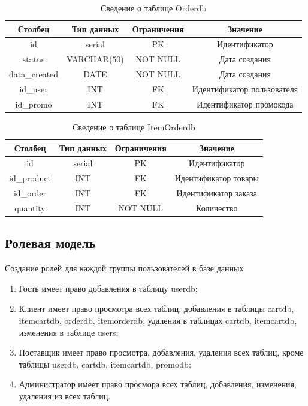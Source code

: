 \begin{table}[H]
	\begin{center}
		\caption{Сведение о таблице Orderdb}
		\begin{tabular}{|c|c|c|c|}
			\hline
			Столбец & Тип данных & Ограничения & Значение \\
			\hline
			id & serial & PK & Идентификатор \\
			\hline
			status & VARCHAR(50) & NOT NULL & Дата создания \\
			\hline
			data\_created & DATE & NOT NULL & Дата создания \\
			\hline
			id\_user & INT & FK & Идентификатор пользователя\\
			\hline
			id\_promo & INT & FK & Идентификатор промокода\\
			\hline			
		\end{tabular}
		\label{table:db:Orderdb}
	\end{center}
\end{table}

\begin{table}[H]
	\begin{center}
		\caption{Сведение о таблице ItemOrderdb}
		\begin{tabular}{|c|c|c|c|}
			\hline
			Столбец & Тип данных & Ограничения & Значение \\
			\hline
			id & serial & PK & Идентификатор \\
			\hline
			id\_product & INT & FK & Идентификатор товары \\
			\hline
			id\_order & INT & FK & Идентификатор заказа \\
			\hline
			quantity & INT & NOT NULL & Количество\\
			\hline		
		\end{tabular}
		\label{table:db:Orderdb}
	\end{center}
\end{table}

\subsection{Ролевая модель}
Создание ролей для каждой группы пользователей в базе данных
\begin{enumerate}
	\item Гость имеет право добавления в таблицу userdb;
	\item Клиент имеет право просмотра всех таблиц, добавления в таблицы cartdb, itemcartdb, orderdb, itemorderdb, удаления в таблицах cartdb, itemcartdb, изменения в таблице users;
	\item Поставщик имеет право просмотра, добавления, удаления всех таблиц, кроме таблицы userdb, cartdb, itemcartdb, promodb;
	\item Администратор имеет право просмора всех таблиц, добавления, изменения, удаления из всех таблиц.
\end{enumerate}
\newpage
